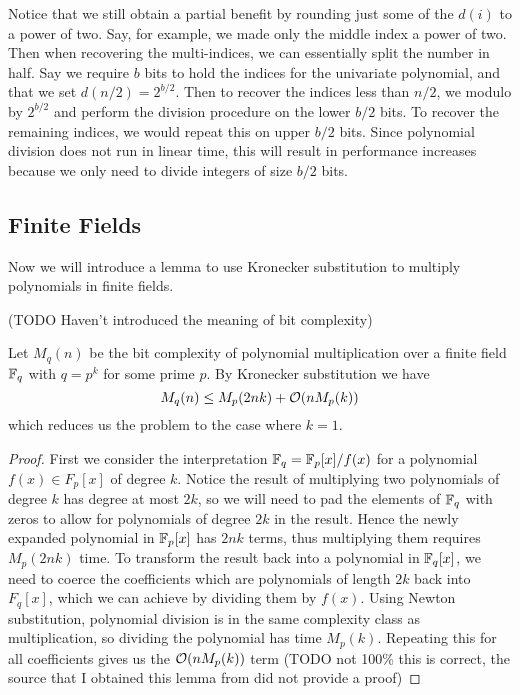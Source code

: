 \medskip

Notice that we still obtain a partial benefit by rounding just some of the $d(i)$ to a power of two. Say, for example, we made only the middle index a power of two. Then when recovering the multi-indices, we can essentially split the number in half. Say we require $b$ bits to hold the indices for the univariate polynomial, and that we set $d(n/2) = 2^{b/2}$. Then to recover the indices less than $n/2$, we modulo by $2^{b/2}$ and perform the division procedure on the lower $b/2$ bits. To recover the remaining indices, we would repeat this on upper $b/2$ bits. Since polynomial division does not run in linear time, this will result in performance increases because we only need to divide integers of size $b/2$ bits.


\subsection{Finite Fields}%
\label{sub:Finite Field}

Now we will introduce a lemma to use Kronecker substitution to multiply polynomials in finite fields.

(TODO Haven't introduced the meaning of bit complexity)
\begin{lemma}
    Let $M_q(n)$ be the bit complexity of polynomial multiplication over a finite field ${\mathbb F}_q$ with $q = p^k$ for some prime $p$. By Kronecker substitution we have
    \[
        M_q(n) \leq M_p(2nk) + \mathcal O(n M_p(k))
    \]
    which reduces us the problem to the case where $k = 1$.
\end{lemma}

\begin{proof}
    First we consider the interpretation ${\mathbb F}_q = {\mathbb F}_p[x] / f(x)$ for a polynomial $f(x) \in F_p[x]$ of degree $k$. Notice the result of multiplying two polynomials of degree $k$ has degree at most $2k$, so we will need to pad the elements of ${\mathbb F}_q$ with zeros to allow for polynomials of degree $2k$ in the result. Hence the newly expanded polynomial in ${\mathbb F}_p[x]$ has $2nk$ terms, thus multiplying them requires $M_p(2nk)$ time. To transform the result back into a polynomial in ${\mathbb F}_q[x]$, we need to coerce the coefficients which are polynomials of length $2k$ back into $F_q[x]$, which we can achieve by dividing them by $f(x)$. Using Newton substitution, polynomial division is in the same complexity class as multiplication, so dividing the polynomial has time $M_p(k)$. Repeating this for all coefficients gives us the $\mathcal O(n M_p(k))$ term (TODO not 100\% this is correct, the source that I obtained this lemma from did not provide a proof)
\end{proof}

